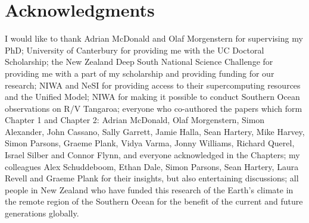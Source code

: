 \section*{Acknowledgments}

I would like to thank
Adrian McDonald and Olaf Morgenstern for supervising my PhD;
University of Canterbury for providing me with the UC Doctoral Scholarship;
the New Zealand Deep South National Science Challenge for providing me with a
part of my scholarship and providing funding for our research;
NIWA and NeSI for providing access to their supercomputing resources and the Unified Model;
NIWA for making it possible to conduct Southern Ocean observations on R/V Tangaroa;
everyone who co-authored the papers which form Chapter 1 and Chapter 2:
Adrian McDonald, Olaf Morgenstern, Simon Alexander, John Cassano,
Sally Garrett, Jamie Halla, Sean Hartery, Mike Harvey, Simon Parsons, Graeme Plank,
Vidya Varma, Jonny Williams, Richard Querel, Israel Silber and Connor Flynn,
and everyone acknowledged in the Chapters;
my colleagues Alex Schuddeboom, Ethan Dale, Simon Parsons, Sean Hartery, Laura Revell and Graeme Plank for their insights, but also entertaining discussions;
all people in New Zealand who have funded this research of the Earth's climate
in the remote region of the Southern Ocean for the benefit of the current and
future generations globally.

